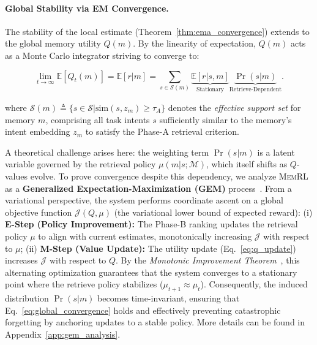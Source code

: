\documentclass{article}
\theoremstyle{plain}
\theoremstyle{definition}
\theoremstyle{remark}
\begin{document}
\paragraph{Global Stability via EM Convergence.}
The stability of the local estimate (Theorem~\ref{thm:ema_convergence}) extends to the global memory utility $Q(m)$. By the linearity of expectation, $Q(m)$ acts as a Monte Carlo integrator striving to converge to:

\begin{equation}
\label{eq:global_convergence}
\lim_{t \to \infty} \mathbb{E}[Q_t(m)] 
= \mathbb{E}[r | m] 
= \sum_{s \in \mathcal{S}(m)} \underbrace{\mathbb{E}[r | s, m]}_{\text{Stationary}} \underbrace{\Pr(s | m)}_{\text{Retrieve-Dependent}}.
\end{equation}

where $\mathcal{S}(m) \triangleq \{ s \in \mathcal{S} | \text{sim}(s, z_m) \ge \tau_A \}$ denotes the \textit{effective support set} for memory $m$, comprising all task intents $s$ sufficiently similar to the memory's intent embedding $z_m$ to satisfy the Phase-A retrieval criterion.



A theoretical challenge arises here: the weighting term $\Pr(s | m)$ is a latent variable governed by the retrieval policy $\mu(m| s; \mathcal{M})$, which itself shifts as $Q$-values evolve. To prove convergence despite this dependency, we analyze \textsc{MemRL} as a \textbf{Generalized Expectation-Maximization (GEM)} process~\citep{dempster1977maximum, neal1998view}.
From a variational perspective, the system performs coordinate ascent on a global objective function $\mathcal{J}(Q, \mu)$ (the variational lower bound of expected reward):
(i) \textbf{E-Step (Policy Improvement):} The Phase-B ranking updates the retrieval policy $\mu$ to align with current estimates, monotonically increasing $\mathcal{J}$ with respect to $\mu$;
(ii) \textbf{M-Step (Value Update):} The utility update (Eq.~\ref{eq:q_update}) increases $\mathcal{J}$ with respect to $Q$.
By the \textit{Monotonic Improvement Theorem}~\citep{neal1998view}, this alternating optimization guarantees that the system converges to a stationary point where the retrieve policy stabilizes ($\mu_{t+1} \approx \mu_t$). Consequently, the induced distribution $\Pr(s | m)$ becomes time-invariant, ensuring that Eq.~\ref{eq:global_convergence} holds and effectively preventing catastrophic forgetting by anchoring updates to a stable policy. More details can be found in Appendix~\ref{app:gem_analysis}.
\end{document}
